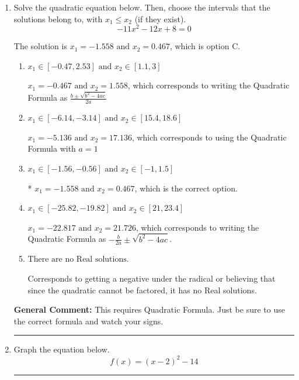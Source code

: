 \documentclass{extbook}[14pt]
\newcommand{\litem}[1]{\item #1

\rule{\textwidth}{0.4pt}}
\begin{document}
\begin{enumerate}\litem{
Solve the quadratic equation below. Then, choose the intervals that the solutions belong to, with $x_1 \leq x_2$ (if they exist).
\[ -11x^{2} -12 x + 8 = 0 \]

The solution is \( x_1 = -1.558 \text{ and } x_2 = 0.467 \), which is option C.\begin{enumerate}[label=\Alph*.]
\item \( x_1 \in [-0.47, 2.53] \text{ and } x_2 \in [1.1, 3] \)

 $x_1 = -0.467 \text{ and } x_2 = 1.558$, which corresponds to writing the Quadratic Formula as $\frac{b \pm \sqrt{b^2 - 4ac}}{2a}$
\item \( x_1 \in [-6.14, -3.14] \text{ and } x_2 \in [15.4, 18.6] \)

 $x_1 = -5.136 \text{ and } x_2 = 17.136$, which corresponds to using the Quadratic Formula with $a=1$
\item \( x_1 \in [-1.56, -0.56] \text{ and } x_2 \in [-1, 1.5] \)

* $x_1 = -1.558 \text{ and } x_2 = 0.467$, which is the correct option.
\item \( x_1 \in [-25.82, -19.82] \text{ and } x_2 \in [21, 23.4] \)

 $x_1 = -22.817 \text{ and } x_2 = 21.726$, which corresponds to writing the Quadratic Formula as $-\frac{b}{2a} \pm \sqrt{b^2 - 4ac}$.
\item \( \text{There are no Real solutions.} \)

Corresponds to getting a negative under the radical or believing that since the quadratic cannot be factored, it has no Real solutions.
\end{enumerate}

\textbf{General Comment:} This requires Quadratic Formula. Just be sure to use the correct formula and watch your signs.
}
\litem{
Graph the equation below.
\[ f(x) = (x-2)^2 - 14 \]

}
\end{enumerate}
\end{document}
